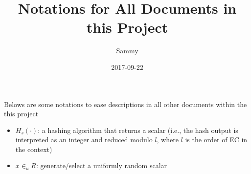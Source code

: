 \documentclass[a4paper,10pt]{article}
\title{Notations for All Documents in this Project}
\author{Sammy}
\date{2017-09-22}
\begin{document}
\maketitle

Belows are some notations to ease descriptions in all other documents within the this project
	\begin{itemize}
		\item \(H_s(\cdot)\): a hashing algorithm that returns a scalar (i.e., the hash output is interpreted as an integer and reduced modulo \(l\), where \(l\) is the order of EC in the context)
		\item \(x\in_u R\): generate/select a uniformly random scalar
	\end{itemize}
\end{document}
